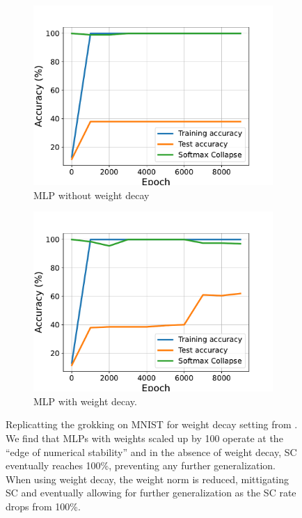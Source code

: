 \begin{figure}[t]
    \vspace{-6mm}
    \centering
    \begin{subfigure}{.48\textwidth}
    \includegraphics[width=\linewidth]{grokking_iclr_arxiv/figures/mnist_grokking.pdf}
        \caption{MLP without weight decay}
        \label{fig:mnist_witout_weight_decay}
    \end{subfigure}
    \begin{subfigure}{.48\textwidth}
    \includegraphics[width=\linewidth]{grokking_iclr_arxiv/figures/mnist_grokking_wd.pdf}
        \caption{MLP with weight decay.}
        \label{fig:mnist}
    \end{subfigure}
    \caption{Replicatting the grokking on MNIST for weight decay setting from \cite{liu2023grokking}. We find that MLPs with weights scaled up by 100 operate at the ``edge of numerical stability'' and in the absence of weight decay, SC eventually reaches 100\%, preventing any further generalization. When using weight decay, the weight norm is reduced, mittigating SC and eventually allowing for further generalization as the SC rate drops from 100\%.}

\end{figure}


